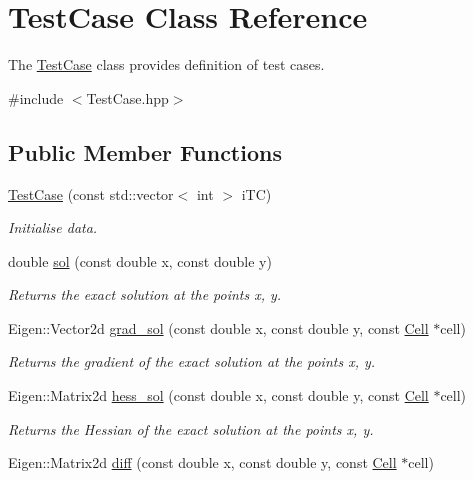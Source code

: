 \hypertarget{classTestCase}{}\section{Test\+Case Class Reference}
\label{classTestCase}


The \hyperlink{classTestCase}{Test\+Case} class provides definition of test cases.  




{\ttfamily \#include $<$Test\+Case.\+hpp$>$}

\subsection*{Public Member Functions}
\begin{DoxyCompactItemize}
\item 
\hyperlink{classTestCase_aa4ad29533416ee515205db87002a1bf1}{Test\+Case} (const std\+::vector$<$ int $>$ i\+TC)
\begin{DoxyCompactList}\small\item\em Initialise data. \end{DoxyCompactList}\item 
double \hyperlink{classTestCase_aede719dac81c460c713d930a379c537e}{sol} (const double x, const double y)
\begin{DoxyCompactList}\small\item\em Returns the exact solution at the points x, y. \end{DoxyCompactList}\item 
Eigen\+::\+Vector2d \hyperlink{classTestCase_a2e3004705b74b232dc54d84652ec88ae}{grad\+\_\+sol} (const double x, const double y, const \hyperlink{classHArDCore2D_1_1Cell}{Cell} $\ast$cell)
\begin{DoxyCompactList}\small\item\em Returns the gradient of the exact solution at the points x, y. \end{DoxyCompactList}\item 
Eigen\+::\+Matrix2d \hyperlink{classTestCase_aadf1375364b34ad3b9fa651eae5baa1e}{hess\+\_\+sol} (const double x, const double y, const \hyperlink{classHArDCore2D_1_1Cell}{Cell} $\ast$cell)
\begin{DoxyCompactList}\small\item\em Returns the Hessian of the exact solution at the points x, y. \end{DoxyCompactList}\item 
Eigen\+::\+Matrix2d \hyperlink{classTestCase_aaf745f4815ce0e9c16d8bded9f9b3596}{diff} (const double x, const double y, const \hyperlink{classHArDCore2D_1_1Cell}{Cell} $\ast$cell)

\end{DoxyCompactItemize}
